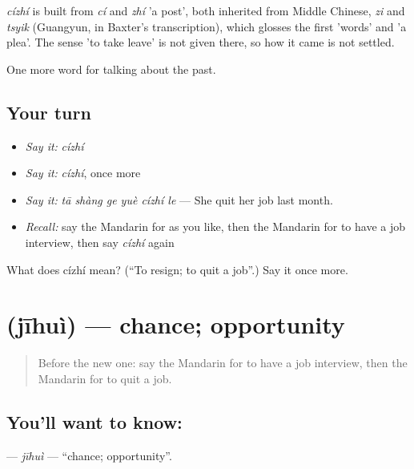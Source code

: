 \begin{cousinweb}
\emph{cízhí} is built from \emph{cí} and \emph{zhí} 'a post', both inherited from Middle Chinese, \emph{zi} and \emph{tsyik} (Guangyun, in Baxter's transcription), which glosses the first 'words' and 'a plea'. The sense 'to take leave' is not given there, so how it came is not settled.
\end{cousinweb}

\begin{grammarlens}[title={What you've built}]
One more word for talking about the past.
\end{grammarlens}

\subsection*{Your turn}
\begin{itemize}
\raggedright
  \item \emph{Say it:} \emph{cízhí}
  \item \emph{Say it:} \emph{cízhí}, once more
  \item \emph{Say it:} \emph{tā shàng ge yuè cízhí le} — She quit her job last month.
  \item \emph{Recall:} say the Mandarin for as you like, then the Mandarin for to have a job interview, then say \emph{cízhí} again
\end{itemize}

\begin{tcolorbox}[breakable,colback=teal!4,colframe=teal!35!black,title={Before you move on}]
What does cízhí mean? (\textquotedblleft{}To resign; to quit a job\textquotedblright{}.) Say it once more.
\end{tcolorbox}
\section[\texorpdfstring{\zh{机会} (jīhuì)}{机会 (jīhuì)}]{ (jīhuì) — chance; opportunity}

\label{lesson:ZH-C276-jihui}



\begin{quote}
Before the new one: say the Mandarin for to have a job interview, then the Mandarin for to quit a job.
\end{quote}

\subsection*{You'll want to know: }
\textbf{} — \emph{jīhuì} — \textquotedblleft{}chance; opportunity\textquotedblright{}.

